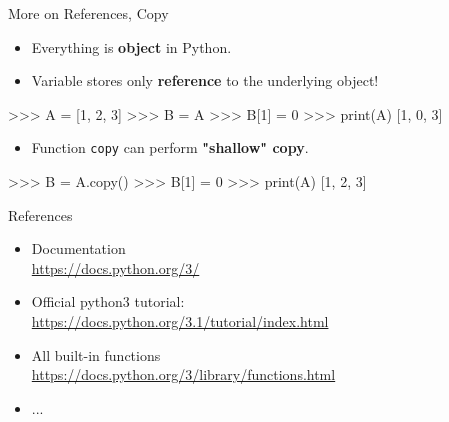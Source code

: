 \documentclass[10pt]{beamer}
\begin{document}
\begin{frame}[fragile]{More on References, Copy}

\begin{itemize}
\item  Everything is \textbf{object} in Python.
\item  Variable stores only \textbf{reference} to the underlying object!
\end{itemize}


\begin{pythoncode}
>>> A = [1, 2, 3]
>>> B = A
>>> B[1] = 0
>>> print(A)
[1, 0, 3]
\end{pythoncode}

\begin{itemize}
\item  Function \small{\texttt{copy}} can perform \textbf{"shallow" copy}.
\end{itemize}
\begin{pythoncode}
>>> B = A.copy()
>>> B[1] = 0
>>> print(A)
[1, 2, 3]
\end{pythoncode}
\end{frame}


\begin{frame}[fragile]{References}

\begin{itemize}
\item Documentation\\
\url{https://docs.python.org/3/}
\item  Official python3 tutorial:\\
\url{https://docs.python.org/3.1/tutorial/index.html}
\item  All built-in functions\\
\url{https://docs.python.org/3/library/functions.html}
\item  ...

\end{itemize}

\end{frame}
\end{document}
